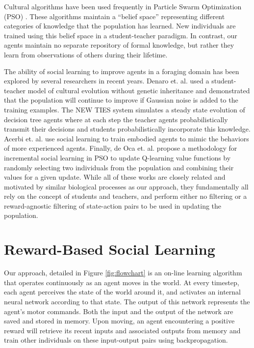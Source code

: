 \documentclass{acm_proc_article-sp}
\begin{document}
Cultural algorithms \cite{reynolds1994introduction} have been used frequently in Particle Swarm Optimization (PSO) \cite{kennedy1995particle}. These algorithms maintain a ``belief space'' representing different categories of knowledge that the population has learned. New individuals are trained using this belief space in a student-teacher paradigm. In contrast, our agents maintain no separate repository of formal knowledge, but rather they learn from observations of others during their lifetime.

The ability of social learning to improve agents in a foraging domain has been explored by several researchers in recent years. Denaro et. al. \cite{denaro1996cultural} used a student-teacher model of cultural evolution without genetic inheritance and demonstrated that the population will continue to improve if Gaussian noise is added to the training examples. The NEW TIES system \cite{haasdijk2008social, vogt2010modeling} simulates a steady state evolution of decision tree agents where at each step the teacher agents probabilistically transmit their decisions and students probabilistically incorporate this knowledge. Acerbi et. al. \cite{acerbi2007social} use social learning to train embodied agents to mimic the behaviors of more experienced agents. Finally, de Oca et. al. \cite{de2011incremental} propose a methodology for incremental social learning in PSO to update Q-learning \cite{watkins1992q} value functions by randomly selecting two individuals from the population and combining their values for a given update. While all of these works are closely related and motivated by similar biological processes as our approach, they fundamentally all rely on the concept of students and teachers, and perform either no filtering or a reward-agnostic filtering of state-action pairs to be used in updating the population.


\section{Reward-Based Social Learning}
\label{sec:rbsl}

Our approach, detailed in Figure \ref{fig:flowchart} is an on-line learning algorithm that operates continuously as an agent moves in the world. At every timestep, each agent perceives the state of the world around it, and activates an internal neural network according to that state. The output of this network represents the agent's motor commands. Both the input and the output of the network are saved and stored in memory. Upon moving, an agent encountering a positive reward will retrieve its recent inputs and associated outputs from memory and train other individuals on these input-output pairs using backpropagation.
\end{document}
